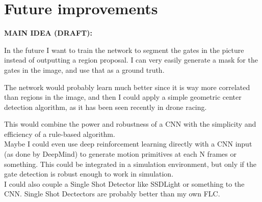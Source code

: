 \chapter{Future improvements}

\textbf{MAIN IDEA (DRAFT):}

In the future I want to train the network to segment the gates in the
picture instead of outputting a region proposal. I can very easily generate a
mask for the gates in the image, and use that as a ground truth.

The network would probably learn much better since it is way more correlated
than regions in the image, and then I could apply a simple geometric center
detection algorithm, as it has been seen recently in drone racing.


This would combine the power and robustness of a CNN with the simplicity and
efficiency of a rule-based algorithm.\\


Maybe I could even use deep reinforcement learning directly with a CNN input
(as done by DeepMind) to generate motion primitives at each N frames or
something. This could be integrated in a simulation environment, but only if
the gate detection is robust enough to work in simulation.\\

I could also couple a Single Shot Detector like SSDLight or something to the
CNN. Single Shot Dectectors are probably better than my own FLC.
